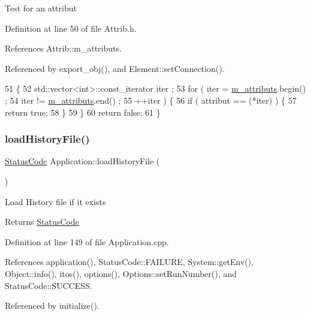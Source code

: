 Test for an attribut 

Definition at line 50 of file Attrib.\+h.



References Attrib\+::m\+\_\+attributs.



Referenced by export\+\_\+obj(), and Element\+::set\+Connection().


\begin{DoxyCode}
51   \{
52     std::vector<int>::const\_iterator iter ;
53     \textcolor{keywordflow}{for} ( iter  = \hyperlink{classAttrib_ac4bd58a0cc6b38a3b711d609a3d3aacc}{m\_attributs}.begin() ;
54           iter != \hyperlink{classAttrib_ac4bd58a0cc6b38a3b711d609a3d3aacc}{m\_attributs}.end()   ;
55           ++iter ) \{
56       \textcolor{keywordflow}{if} ( attribut == (*iter) ) \{
57         \textcolor{keywordflow}{return} \textcolor{keyword}{true};
58       \}
59     \}
60     \textcolor{keywordflow}{return} \textcolor{keyword}{false};
61   \}
\end{DoxyCode}
\mbox{\label{classApplication_ab5d46fc4784a4c821e974f5a47ec933d}} 
\subsubsection{\texorpdfstring{load\+History\+File()}{loadHistoryFile()}}
{\footnotesize\ttfamily \hyperlink{classStatusCode}{Status\+Code} Application\+::load\+History\+File (\begin{DoxyParamCaption}{ }\end{DoxyParamCaption})}

Load History file if it exists \begin{DoxyReturn}{Returns}
\hyperlink{classStatusCode}{Status\+Code} 
\end{DoxyReturn}


Definition at line 149 of file Application.\+cpp.



References application(), Status\+Code\+::\+F\+A\+I\+L\+U\+RE, System\+::get\+Env(), Object\+::info(), itos(), options(), Options\+::set\+Run\+Number(), and Status\+Code\+::\+S\+U\+C\+C\+E\+SS.



Referenced by initialize().


